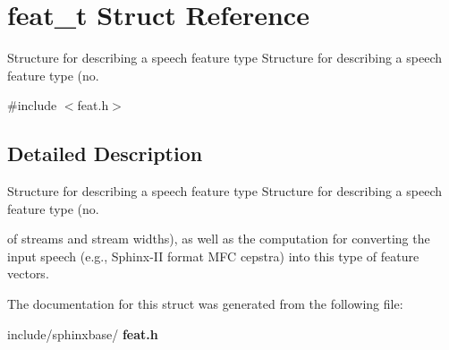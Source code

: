 \section{feat\+\_\+t Struct Reference}
\label{structfeat__t}


Structure for describing a speech feature type Structure for describing a speech feature type (no.  




{\ttfamily \#include $<$feat.\+h$>$}



\subsection{Detailed Description}
Structure for describing a speech feature type Structure for describing a speech feature type (no. 

of streams and stream widths), as well as the computation for converting the input speech (e.\+g., Sphinx-\/\+II format M\+FC cepstra) into this type of feature vectors. 

The documentation for this struct was generated from the following file\+:\begin{DoxyCompactItemize}
\item 
include/sphinxbase/\textbf{ feat.\+h}\end{DoxyCompactItemize}
